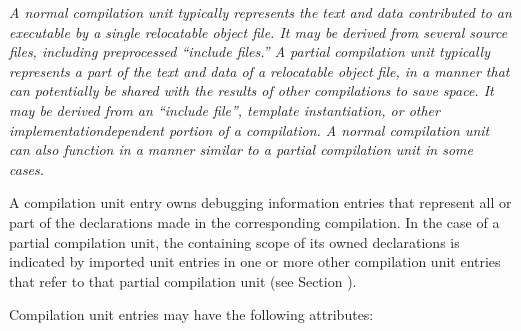\textit{A normal compilation unit typically represents the text and
data contributed to an executable by a single relocatable
object file. It may be derived from several source files,
including pre\dash processed ``include files.'' A partial
compilation unit typically represents a part of the text
and data of a relocatable object file, in a manner that can
potentially be shared with the results of other compilations
to save space. It may be derived from an ``include file'',
template instantiation, or other implementation\dash dependent
portion of a compilation. A normal compilation unit can also
function in a manner similar to a partial compilation unit
in some cases.}

A compilation unit entry owns debugging information
entries that represent all or part of the declarations
made in the corresponding compilation. In the case of a
partial compilation unit, the containing scope of its owned
declarations is indicated by imported unit entries in one
or more other compilation unit entries that refer to that
partial compilation unit (see 
Section ).


Compilation unit entries may have the following 
attributes:


